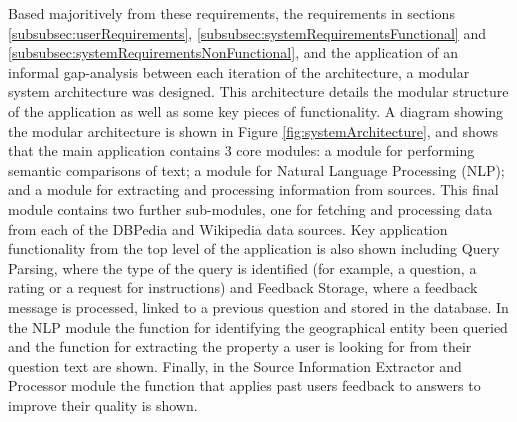 \documentclass[authoryearcitations]{UoYCSproject}
\begin{document}
Based majoritively from these requirements, the requirements in sections \ref{subsubsec:userRequirements}, \ref{subsubsec:systemRequirementsFunctional} and \ref{subsubsec:systemRequirementsNonFunctional}, and the application of an informal gap-analysis between each iteration of the architecture, a modular system architecture was designed. This architecture details the modular structure of the application as well as some key pieces of functionality. A diagram showing the modular architecture is shown in Figure \ref{fig:systemArchitecture}, and shows that the main application contains 3 core modules: a module for performing semantic comparisons of text; a module for Natural Language Processing (NLP); and a module for extracting and processing information from sources. This final module contains two further sub-modules, one for fetching and processing data from each of the DBPedia and Wikipedia data sources. Key application functionality from the top level of the application is also shown including Query Parsing, where the type of the query is identified (for example, a question, a rating or a request for instructions) and Feedback Storage, where a feedback message is processed, linked to a previous question and stored in the database. In the NLP module the function for identifying the geographical entity been queried and the function for extracting the property a user is looking for from their question text are shown. Finally, in the Source Information Extractor and Processor module the function that applies past users feedback to answers to improve their quality is shown.
\end{document}
